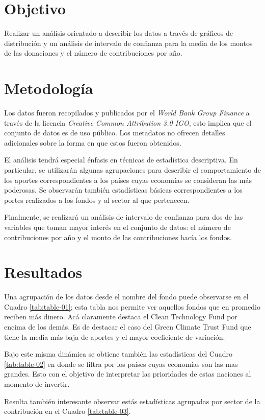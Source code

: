 \documentclass[11pt,letterpaper]{article}
\begin{document}
\section{Objetivo}	
Realizar un análisis orientado a describir los datos a través de gráficos de distribución y un análisis de intervalo de confianza para la media de los montos de las donaciones y el número de contribuciones por año.

\section{Metodología}
Los datos fueron recopilados y publicados por el {\em World Bank Group Finance} a través de la licencia {\em Creative Common Attribution 3.0 IGO}, esto implica que el conjunto de datos es de uso público. Los metadatos no ofrecen detalles adicionales sobre la forma en que estos fueron obtenidos.

El análisis tendrá especial énfasis en técnicas de estadística descriptiva. En particular, se utilizarán algunas agrupaciones para describir el comportamiento de los aportes correspondientes a los países cuyas economías se consideran las más poderosas. Se observarán también estadísticas básicas correspondientes a los portes realizados a los fondos y al sector al que pertenecen.

Finalmente, se realizará un análisis de intervalo de confianza para dos de las variables que toman mayor interés en el conjunto de datos: el número de contribuciones por año y el monto de las contribuciones hacía los fondos.

\section{Resultados}
Una agrupación de los datos desde el nombre del fondo puede observarse en el Cuadro \ref{tab:table-01}; esta tabla nos permite ver aquellos fondos que en promedio reciben más dinero. Acá claramente destaca el Clean Technology Fund por encima de los demás. Es de destacar el caso del Green Climate Trust Fund que tiene la media más baja de aportes y el mayor coeficiente de variación.

Bajo este misma dinámica se obtiene también las estadísticas del Cuadro \ref{tab:table-02} en donde se filtra por los países cuyas economías son las mas grandes. Esto con el objetivo de interpretar las prioridades de estas naciones al momento de invertir.

Resulta también interesante observar estás estadísticas agrupadas por sector de la contribución en el Cuadro \ref{tab:table-03}.
\end{document}
